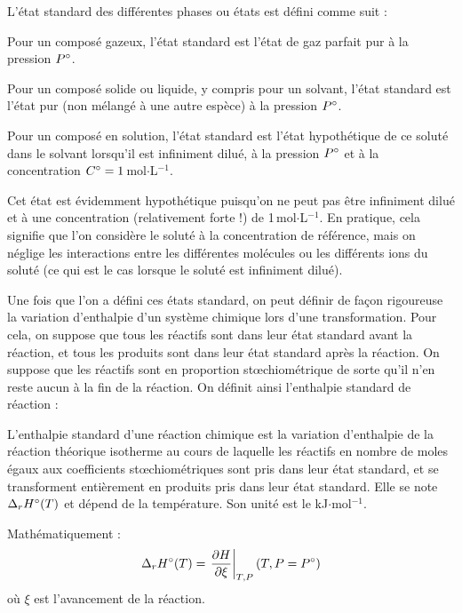 \documentclass[11pt,fleqn]{book} %
\begin{document}
L'état standard des différentes phases ou états est défini comme suit :
\begin{definition}
   Pour un composé gazeux, l'état standard est l'état de gaz parfait pur à la pression $P \degree$.
\end{definition}
\begin{definition}
   Pour un composé solide ou liquide, y compris pour un solvant, l'état standard est l'état pur (non mélangé à une autre espèce) à la pression $P \degree$.
\end{definition}
\begin{definition}
   Pour un composé en solution, l'état standard est l’état hypothétique de ce soluté dans le solvant lorsqu’il est inﬁniment dilué, à la pression $P \degree$ et à la concentration $C \degree = 1$\,mol$\cdot$L$^{-1}$. 
\end{definition}
\begin{remark}
    Cet état est évidemment hypothétique puisqu'on ne peut pas être infiniment dilué et à une concentration (relativement forte !) de 1\,mol$\cdot$L$^{-1}$. En pratique, cela signifie que l'on considère le soluté à la concentration de référence, mais on néglige les interactions entre les différentes molécules ou les différents ions du soluté (ce qui est le cas lorsque le soluté est infiniment dilué).
\end{remark}

Une fois que l'on a défini ces états standard, on peut définir de façon rigoureuse la variation d'enthalpie d'un système chimique lors d'une transformation. Pour cela, on suppose que tous les réactifs sont dans leur état standard avant la réaction, et tous les produits sont dans leur état standard après la réaction. On suppose que les réactifs sont en proportion stœchiométrique de sorte qu'il n'en reste aucun à la fin de la réaction. On définit ainsi l'enthalpie standard de réaction :
\begin{definition}
    L'enthalpie standard d'une réaction chimique est la variation d’enthalpie de la réaction théorique isotherme au cours de laquelle les réactifs en nombre de moles égaux aux coeﬃcients stœchiométriques sont pris dans leur état standard, et se transforment entièrement en produits pris dans leur état standard. Elle se note $\Delta_r H \degree(T)$ et dépend de la température. Son unité est le kJ$\cdot$mol$^{-1}$.
    
    Mathématiquement :
    \begin{equation}
        \Delta_r H \degree(T) = \left.\frac{\partial H}{\partial \xi}\right|_{T,P}(T,P=P^\circ)
    \end{equation}
    où $\xi$ est l'avancement de la réaction.
\end{definition}
\end{document}

